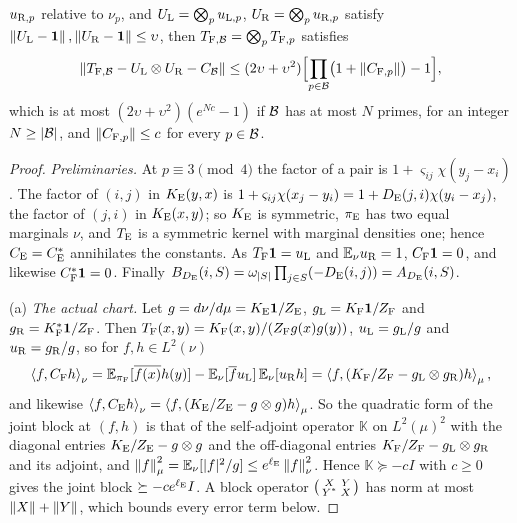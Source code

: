\begin{lemma}
\begin{enumerate}[label=\textup{(\alph*)}]
 $u_{{\rm R},p}$ relative to $\nu_p$, and $U_{\rm L}=\bigotimes_pu_{{\rm L},p}$,
 $U_{\rm R}=\bigotimes_pu_{{\rm R},p}$ satisfy
 $\left\|U_{\rm L}-\mathbf 1\right\|,\left\|U_{\rm R}-\mathbf 1\right\|\le\upsilon$, then
 $T_{{\rm F},\mathcal B}=\bigotimes_pT_{{\rm F},p}$ satisfies
 \[
  \left\|T_{{\rm F},\mathcal B}-U_{\rm L}\otimes U_{\rm R}-C_\mathcal B\right\|\le(2\upsilon+\upsilon^2)
  \Bigl[\prod_{p\in\mathcal B}\bigl(1+\left\|C_{{\rm F},p}\right\|\bigr)-1\Bigr],
 \]
 which is at most $(2\upsilon+\upsilon^2)(e^{Nc}-1)$ if $\mathcal B$ has at most $N$
 primes, for an integer $N\ge|\mathcal B|$, and $\left\|C_{{\rm F},p}\right\|\le c$ for
 every $p\in\mathcal B$.
\end{enumerate}
\end{lemma}

\begin{proof}
\emph{Preliminaries.} At $p\equiv3\pmod4$ the factor of a pair is
$1+\varsigma_{ij}\chi(y_j-x_i)$. The factor of $(i,j)$ in $K_{\rm E}(y,x)$ is
$1+\varsigma_{ij}\chi(x_j-y_i)=1+D_{\rm E}(j,i)\chi(y_i-x_j)$, the factor of $(j,i)$ in
$K_{\rm E}(x,y)$; so $K_{\rm E}$ is symmetric, $\pi_{\rm E}$ has two equal marginals
$\nu$, and $T_{\rm E}$ is a symmetric kernel with marginal densities one; hence
$C_{\rm E}=C_{\rm E}^*$ annihilates the constants. As $T_{\rm F}\mathbf 1=u_{\rm L}$ and
$\mathbb E_\nu u_{\rm R}=1$, $C_{\rm F}\mathbf 1=0$, and likewise $C_{\rm F}^*\mathbf 1=0$. Finally
$B_{D_{\rm E}}(i,S)=\omega_{|S|}\prod_{j\in S}(-D_{\rm E}(i,j))=A_{D_{\rm E}}(i,S)$.

(a) \emph{The actual chart.} Let $g=d\nu/d\mu=K_{\rm E}\mathbf 1/Z_{\rm E}$,
$g_{\rm L}=K_{\rm F}\mathbf 1/Z_{\rm F}$ and $g_{\rm R}=K_{\rm F}^*\mathbf 1/Z_{\rm F}$. Then
$T_{\rm F}(x,y)=K_{\rm F}(x,y)/(Z_{\rm F}g(x)g(y))$, $u_{\rm L}=g_{\rm L}/g$ and
$u_{\rm R}=g_{\rm R}/g$, so for $f,h\in L^2(\nu)$
\[
 \left\langle f,C_{\rm F}h\right\rangle_\nu=\mathbb E_{\pi_{\rm F}}[\overline{f(x)}h(y)]-\mathbb E_\nu[\overline f u_{\rm L}]\,\mathbb E_\nu[u_{\rm R}h]
 =\left\langle f,(K_{\rm F}/Z_{\rm F}-g_{\rm L}\otimes g_{\rm R})h\right\rangle_\mu,
\]
and likewise $\left\langle f,C_{\rm E}h\right\rangle_\nu=\left\langle f,(K_{\rm E}/Z_{\rm E}-g\otimes g)h\right\rangle_\mu$. So the
quadratic form of the joint block at $(f,h)$ is that of the self-adjoint operator
$\mathbb K$ on $L^2(\mu)^2$ with the diagonal entries $K_{\rm E}/Z_{\rm E}-g\otimes g$
and the off-diagonal entries $K_{\rm F}/Z_{\rm F}-g_{\rm L}\otimes g_{\rm R}$ and its
adjoint, and $\left\|f\right\|^2_\mu=\mathbb E_\nu[|f|^2/g]\le e^{\ell_{\rm E}}\left\|f\right\|^2_\nu$. Hence
$\mathbb K\succeq-cI$ with $c\ge0$ gives the joint block $\succeq-ce^{\ell_{\rm E}}I$. A
block operator $\begin{psmallmatrix}X&Y\\Y^*&X\end{psmallmatrix}$ has norm at most
$\left\|X\right\|+\left\|Y\right\|$, which bounds every error term below.


\end{proof}
